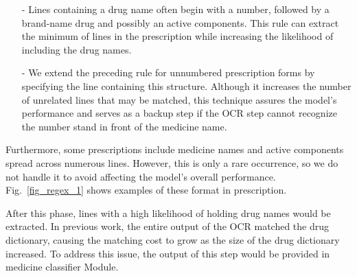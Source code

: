\begin{itemize}

\item[-] Lines containing a drug name often begin with a number, followed by a brand-name drug and possibly an active components. This rule can extract the minimum of lines in the prescription while increasing the likelihood of including the drug names.
\item[-] We extend the preceding rule for unnumbered prescription forms by specifying the line containing this structure. Although it increases the number of unrelated lines that may be matched, this technique assures the model's performance and serves as a backup step if the OCR step cannot recognize the number stand in front of the medicine name. 
\end{itemize}

Furthermore, some prescriptions include medicine names and active components spread across numerous lines. However, this is only a rare occurrence, so we do not handle it to avoid affecting the model's overall performance.
Fig.~\ref{fig_regex_1} shows examples of these format in prescription.  

After this phase, lines with a high likelihood of holding drug names would be extracted. In previous work, the entire output of the OCR matched the drug dictionary, causing the matching cost to grow as the size of the drug dictionary increased. To address this issue, the output of this step would be provided in medicine classifier Module.
